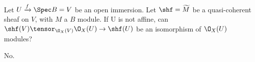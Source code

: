 \begin{question}
Let $U \xrightarrow{f} \Spec B = V$ be an open immersion.
Let $\shf=\widetilde{M}$ be a quasi-coherent sheaf on $V$, with $M$ a $B$ module. 
If U is not affine, can $\shf(V)\tensor_{\O_X(V)} \O_X(U) \rightarrow \shf(U)$ be an isomorphism of $\O_X(U)$ modules?
\end{question}
\begin{Qanswer}
No.
\end{Qanswer}
